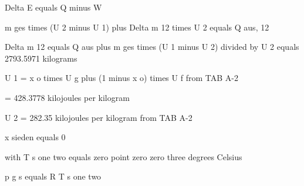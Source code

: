 Delta E equals Q minus W

m ges times (U 2 minus U 1) plus Delta m 12 times U 2 equals Q aus, 12

Delta m 12 equals Q aus plus m ges times (U 1 minus U 2) divided by U 2 equals 2793.5971 kilograms

U 1 = x o times U g plus (1 minus x o) times U f from TAB A-2

= 428.3778 kilojoules per kilogram

U 2 = 282.35 kilojoules per kilogram from TAB A-2

x sieden equals 0

with T s one two equals zero point zero zero three degrees Celsius

p g s equals R T s one two